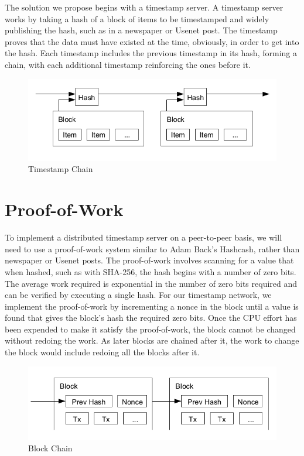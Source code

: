 The solution we propose begins with a timestamp server. A timestamp server works by taking a hash of a block of items to be timestamped and widely publishing the hash, such as in a newspaper or Usenet post. The timestamp proves that the data must have existed at the time, obviously, in order to get into the hash. Each timestamp includes the previous timestamp in its hash, forming a chain, with each additional timestamp reinforcing the ones before it.

\begin{figure}[ht!]
\centering
\includegraphics[trim = 0mm 0mm 0mm 0mm, width=120mm]{images/timestamp}
\caption{Timestamp Chain}
\end{figure}

\section{Proof-of-Work}

To implement a distributed timestamp server on a peer-to-peer basis, we will need to use a proof-of-work system similar to Adam Back's Hashcash, rather than newspaper or Usenet posts. The proof-of-work involves scanning for a value that when hashed, such as with SHA-256, the hash begins with a number of zero bits. The average work required is exponential in the number of zero bits required and can be verified by executing a single hash.
For our timestamp network, we implement the proof-of-work by incrementing a nonce in the block until a value is found that gives the block's hash the required zero bits. Once the CPU effort has been expended to make it satisfy the proof-of-work, the block cannot be changed without redoing the work. As later blocks are chained after it, the work to change the block would include redoing all the blocks after it.

\begin{figure}[ht!]
\centering
\includegraphics[trim = 0mm 0mm 0mm 0mm, width=120mm]{images/block_chain}
\caption{Block Chain}
\end{figure}

